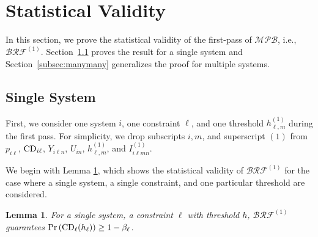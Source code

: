 \documentclass[11pt]{article}
\newtheorem{lemma}{Lemma}
\begin{document}
\section{Statistical Validity} 
\label{sec:statistical validity}

In this section, we prove the statistical validity of the first-pass of $\mathcal{MPB}$, i.e., $\mathcal{BRF}^{(1)}$. Section~\ref{subsec:oneone} proves the result for a single system and Section~\ref{subsec:manymany} generalizes the proof for multiple systems.  

\subsection{Single System} 
\label{subsec:oneone}

First, we consider one system $i$, one constraint $\ell$, and one threshold $h_{\ell,m}^{(1)}$ during the first pass. %
For simplicity, we drop subscripts $i, m$, and superscript $(1)$ from $p_{i\ell}$, ${\rm CD}_{i\ell}$, $Y_{i\ell n}$, $U_{in}$, $h_{\ell, m}^{(1)}$, and $I_{i \ell mn}^{(1)}$. 


We begin with Lemma \ref{thm:single_system_single_threshold}, which shows the statistical validity of $\mathcal{BRF}^{(1)}$ for the case where a single system, a single constraint, and one particular threshold are considered. 

\begin{lemma} 
\label{thm:single_system_single_threshold}
For a single system, a constraint $\ell$ with threshold $h$, $\mathcal{BRF}^{(1)}$ guarantees $\Pr\left( {\rm CD}_\ell(h_\ell) \right)  \ge 1 - \beta_\ell$.
\end{lemma}
\end{document}
